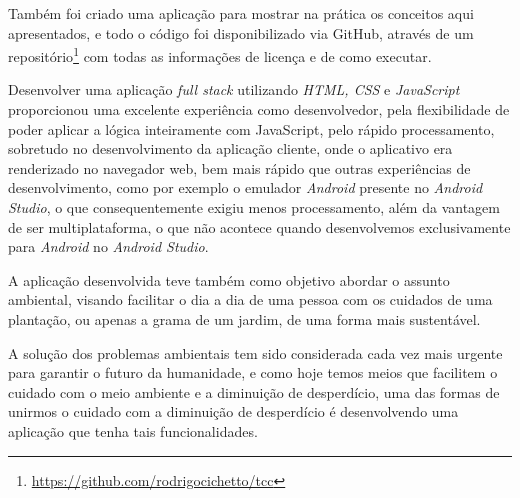 \documentclass[
	12pt,				%
	openright,			%
	twoside,			%
	a4paper,			%
	english,			%
	brazil				%
	]{abntex2}
\begin{document}
Também foi criado uma aplicação para mostrar na prática os conceitos aqui apresentados, e todo o código foi disponibilizado via GitHub, através de um repositório\footnote{\url{https://github.com/rodrigocichetto/tcc}} com todas as informações de licença e de como executar.

Desenvolver uma aplicação \textit{full stack} utilizando \textit{HTML, CSS} e \textit{JavaScript} proporcionou uma excelente experiência como desenvolvedor, pela flexibilidade de poder aplicar a lógica inteiramente com JavaScript, pelo rápido processamento, sobretudo no desenvolvimento da aplicação cliente, onde o aplicativo era renderizado no navegador web, bem mais rápido que outras experiências de desenvolvimento, como por exemplo o emulador \textit{Android} presente no \textit{Android Studio}, o que consequentemente exigiu menos processamento, além da vantagem de ser multiplataforma, o que não acontece quando desenvolvemos exclusivamente para \textit{Android} no \textit{Android Studio}.

A aplicação desenvolvida teve também como objetivo abordar o assunto ambiental, visando facilitar o dia a dia de uma pessoa com os cuidados de uma plantação, ou apenas a grama de um jardim, de uma forma mais sustentável.

A solução dos problemas ambientais tem sido considerada cada vez mais urgente para garantir o futuro da humanidade, e como hoje temos meios que facilitem o cuidado com o meio ambiente e a diminuição de desperdício, uma das formas de unirmos o cuidado com a diminuição de desperdício é desenvolvendo uma aplicação que tenha tais funcionalidades.

\postextual

% 


%
%


\end{document}
